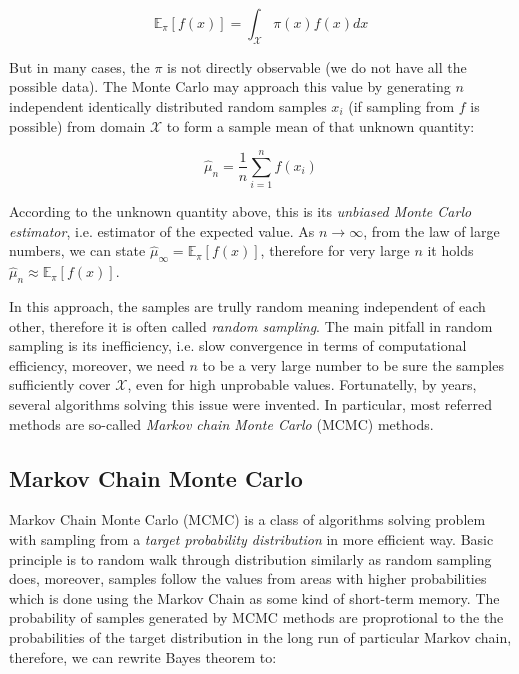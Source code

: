 \documentclass[
  digital, %
  oneside, %
  lof,     %
  lot,     %
]{fithesis4}
\begin{document}
\begin{equation}
\mathbb{E}_{\pi}\left[ f(x) \right] = \int_{\mathcal{X}} \pi \left( x \right) f \left( x \right) dx
\end{equation}

But in many cases, the $\pi$ is not directly 
observable (we do not have all the possible data). 
The Monte Carlo may approach this value by 
generating $n$ independent identically distributed 
random samples $x_i$ (if sampling from $f$ is 
possible) from domain $\mathcal{X}$ to form a 
sample mean of that unknown quantity:

\begin{equation}
\hat{\mu}_n = \frac{1}{n} \sum_{i=1}^{n} f \left( x_i \right)
\end{equation}

According to the unknown quantity above, this 
is its \textit{unbiased Monte Carlo estimator}, i.e. 
estimator of the expected value. 
As $n \to \infty$, from the law of large numbers, 
we can state 
$\hat{\mu}_{\infty} = \mathbb{E}_{\pi}\left[ f(x) \right]$, 
therefore for very large $n$ it holds 
$\hat{\mu}_n \approx \mathbb{E}_{\pi}\left[ f(x) \right]$.

In this approach, the samples are trully 
random meaning independent of each other, 
therefore it is often called 
\textit{random sampling}. 
The main pitfall in random sampling is its 
inefficiency, i.e. slow convergence in terms 
of computational efficiency, moreover, we 
need $n$ to be a very large number to be 
sure the samples sufficiently cover 
$\mathcal{X}$, even for high unprobable values. 
Fortunatelly, by years, several algorithms 
solving this issue were invented. 
In particular, most referred methods are 
so-called \textit{Markov chain Monte Carlo} (MCMC) 
methods.


\subsection{Markov Chain Monte Carlo}

Markov Chain Monte Carlo (MCMC) is a class of 
algorithms solving problem with sampling from a 
\textit{target probability distribution} in more 
efficient way. 
Basic principle is to random walk through 
distribution similarly as random sampling 
does, moreover, samples follow the values 
from areas with higher probabilities which is 
done using the Markov Chain as some kind 
of short-term memory. 
The probability of samples generated by 
MCMC methods are proprotional to the the 
probabilities of the target distribution in 
the long run of particular Markov chain, 
therefore, we can rewrite Bayes theorem to:
\end{document}
